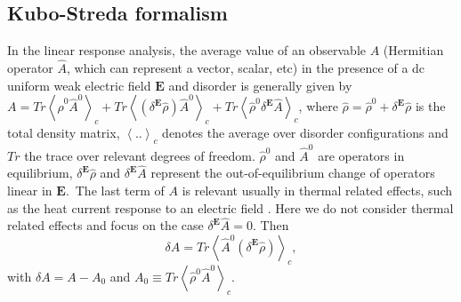 \documentclass
[aps,pra,amsfonts,amssymb,twocolumn,amsmath,preprintnumbers,nofootinbib,floatfix,
showpacs,superscriptaddress]{revtex4-1}%
\begin{document}
\subsection{Kubo-Streda formalism}

In the linear response analysis, the average value of an observable $A$
(Hermitian operator $\hat{A}$, which can represent a vector, scalar, etc) in
the presence of a dc uniform weak electric field $\mathbf{E}$ and disorder is
generally given by \cite{Streda1977} $A=Tr\left\langle \hat{\rho}^{0}\hat
{A}^{0}\right\rangle _{c}+Tr\left\langle \left(  \delta^{\mathbf{E}}\hat{\rho
}\right)  \hat{A}^{0}\right\rangle _{c}+Tr\left\langle \hat{\rho}^{0}%
\delta^{\mathbf{E}}\hat{A}\right\rangle _{c}$, where $\hat{\rho}=\hat{\rho
}^{0}+\delta^{\mathbf{E}}\hat{\rho}$ is the total density matrix,
$\left\langle ..\right\rangle _{c}$ denotes the average over disorder
configurations and $Tr$ the trace over relevant degrees of freedom. $\hat
{\rho}^{0}$ and $\hat{A}^{0}$ are operators in equilibrium, $\delta
^{\mathbf{E}}\hat{\rho}$ and $\delta^{\mathbf{E}}\hat{A}$ represent the
out-of-equilibrium change of operators linear in $\mathbf{E}$.\ The last term
of $A$ is relevant usually in thermal related effects, such as the heat
current response to an electric field \cite{Streda1977}. Here we do not
consider thermal related effects and focus on the case $\delta^{\mathbf{E}%
}\hat{A}=0$. Then%
\begin{equation}
\delta A=Tr\left\langle \hat{A}^{0}\left(  \delta^{\mathbf{E}}\hat{\rho
}\right)  \right\rangle _{c}, \label{general}%
\end{equation}
with $\delta A=A-A_{0}$ and $A_{0}\equiv Tr\left\langle \hat{\rho}^{0}\hat
{A}^{0}\right\rangle _{c}$.
\end{document}
